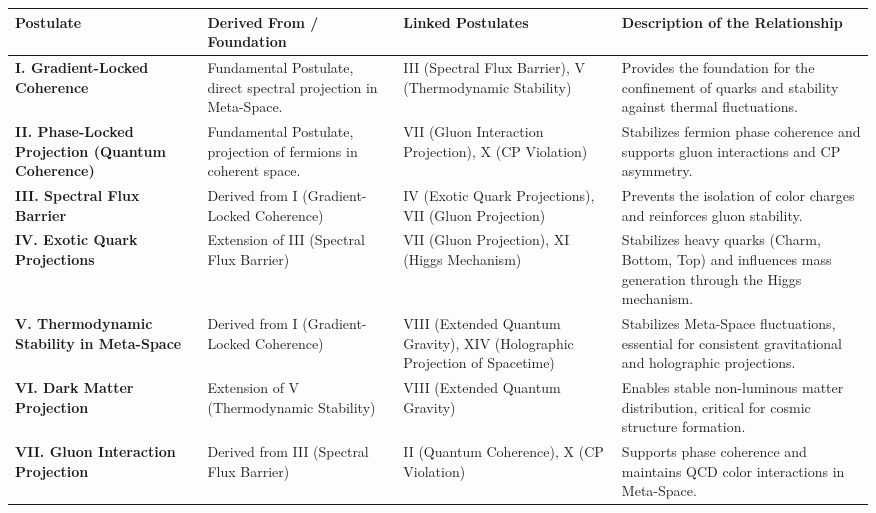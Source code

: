 \documentclass[10.5pt,a4paper]{article}
\begin{document}
\begin{landscape}

\begin{tabularx}{\linewidth}{>{\bfseries}X X X X}
\toprule
Postulate & Derived From / Foundation & Linked Postulates & Description of the Relationship \\
\midrule

\textbf{I. Gradient-Locked Coherence} &
Fundamental Postulate, direct spectral projection in Meta-Space. &
III (Spectral Flux Barrier), V (Thermodynamic Stability) &
Provides the foundation for the confinement of quarks and stability against thermal fluctuations. \\

\textbf{II. Phase-Locked Projection (Quantum Coherence)} &
Fundamental Postulate, projection of fermions in coherent space. &
VII (Gluon Interaction Projection), X (CP Violation) &
Stabilizes fermion phase coherence and supports gluon interactions and CP asymmetry. \\

\textbf{III. Spectral Flux Barrier} &
Derived from I (Gradient-Locked Coherence) &
IV (Exotic Quark Projections), VII (Gluon Projection) &
Prevents the isolation of color charges and reinforces gluon stability. \\

\textbf{IV. Exotic Quark Projections} &
Extension of III (Spectral Flux Barrier) &
VII (Gluon Projection), XI (Higgs Mechanism) &
Stabilizes heavy quarks (Charm, Bottom, Top) and influences mass generation through the Higgs mechanism. \\

\textbf{V. Thermodynamic Stability in Meta-Space} &
Derived from I (Gradient-Locked Coherence) &
VIII (Extended Quantum Gravity), XIV (Holographic Projection of Spacetime) &
Stabilizes Meta-Space fluctuations, essential for consistent gravitational and holographic projections. \\

\textbf{VI. Dark Matter Projection} &
Extension of V (Thermodynamic Stability) &
VIII (Extended Quantum Gravity) &
Enables stable non-luminous matter distribution, critical for cosmic structure formation. \\

\textbf{VII. Gluon Interaction Projection} &
Derived from III (Spectral Flux Barrier) &
II (Quantum Coherence), X (CP Violation) &
Supports phase coherence and maintains QCD color interactions in Meta-Space. \\


\end{tabularx}
\end{landscape}
\end{document}
